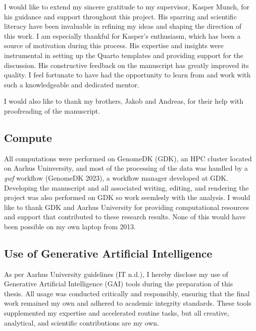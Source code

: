 \documentclass[
  11pt,
  a4paper,
]{scrbook}
\begin{document}
I would like to extend my sincere gratitude to my supervisor, Kasper
Munch, for his guidance and support throughout this project. His
sparring and scientific literacy have been invaluable in refining my
ideas and shaping the direction of this work. I am especially thankful
for Kasper's enthusiasm, which has been a source of motivation during
this process. His expertise and insights were instrumental in setting up
the Quarto templates and providing support for the discussion. His
constructive feedback on the manuscript has greatly improved its
quality. I feel fortunate to have had the opportunity to learn from and
work with such a knowledgeable and dedicated mentor.

I would also like to thank my brothers, Jakob and Andreas, for their
help with proofreading of the manuscript.

\subsection*{Compute}\label{compute}

All computations were performed on GenomeDK (GDK), an HPC cluster
located on Aarhus Uninversity, and most of the processing of the data
was handled by a \emph{gwf} workflow (GenomeDK 2023), a workflow manager
developed at GDK. Developing the manuscript and all associated writing,
editing, and rendering the project was also performed on GDK so work
seemlesly with the analysis. I would like to thank GDK and Aarhus
University for providing computational resources and support that
contributed to these research results. None of this would have been
possible on my own laptop from 2013.

\subsection*{Use of Generative Artificial
Intelligence}\label{use-of-generative-artificial-intelligence}

As per Aarhus University guidelines (IT n.d.), I hereby disclose my use
of Generative Artificial Intelligence (GAI) tools during the preparation
of this thesis. All usage was conducted critically and responsibly,
ensuring that the final work remained my own and adhered to academic
integrity standards. These tools supplemented my expertise and
accelerated routine tasks, but all creative, analytical, and scientific
contributions are my own.
\end{document}
